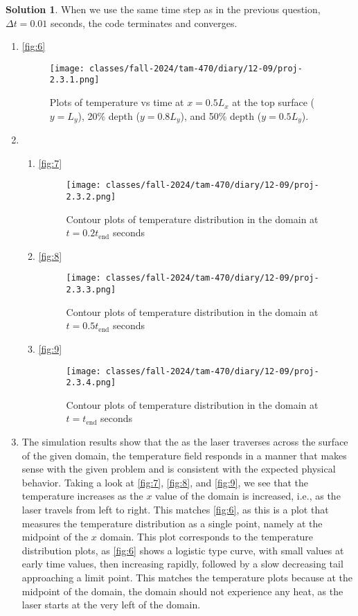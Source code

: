 \documentclass[12pt]{article}
\theoremstyle{definition} %
\newtheorem{solution}{Solution}
\theoremstyle{plain} %
\begin{document}
\begin{solution}


When we use the same time step as in the previous question, $\Delta t=0.01$ seconds, the code terminates and converges.
     \begin{enumerate}
        \item \autoref{fig:6} \begin{figure}[htbp]
            \centering
            \texttt{[image: classes/fall-2024/tam-470/diary/12-09/proj-2.3.1.png]}
            \caption{Plots of temperature vs time at $x = 0.5L_x$ at the top surface ($y = L_y$), 20\% depth ($y = 0.8L_y$), and 50\% depth ($y = 0.5L_y$).}
            \label{fig:6}
        \end{figure}
        \item \begin{enumerate}
           \item  \autoref{fig:7} \begin{figure}[htbp]
            \centering
            \texttt{[image: classes/fall-2024/tam-470/diary/12-09/proj-2.3.2.png]}
            \caption{Contour plots of temperature distribution in the domain at $t = 0.2t_\text{end}$ seconds}
            \label{fig:7}
        \end{figure}
        \item \autoref{fig:8} \begin{figure}[htbp]
            \centering
            \texttt{[image: classes/fall-2024/tam-470/diary/12-09/proj-2.3.3.png]}
            \caption{Contour plots of temperature distribution in the domain at $t = 0.5t_\text{end}$ seconds}
            \label{fig:8}
        \end{figure}
    \item \autoref{fig:9} \begin{figure}[htbp]
        \centering
        \texttt{[image: classes/fall-2024/tam-470/diary/12-09/proj-2.3.4.png]}
        \caption{Contour plots of temperature distribution in the domain at $t = t_\text{end}$ seconds}
        \label{fig:9}
    \end{figure}
        \end{enumerate}
        \item The simulation results show that the as the laser traverses across the surface of the given domain, the temperature field responds in a manner that makes sense with the given problem and is consistent with the expected physical behavior. Taking a look at \autoref{fig:7}, \autoref{fig:8}, and \autoref{fig:9}, we see that the temperature increases as the $x$ value of the domain is increased, i.e., as the laser travels from left to right. This matches \autoref{fig:6}, as this is a plot that measures the temperature distribution as a single point, namely at the midpoint of the $x$ domain. This plot corresponds to the temperature distribution plots, as \autoref{fig:6} shows a logistic type curve, with small values at early time values, then increasing rapidly, followed by a slow decreasing tail approaching a limit point. This matches the temperature plots because at the midpoint of the domain, the domain should not experience any heat, as the laser starts at the very left of the domain. 

\end{enumerate}
\end{solution}
\end{document}
